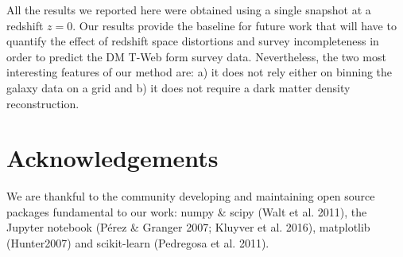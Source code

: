 \documentclass[usenatbib]{mnras}
\begin{document}
All the results we reported here were obtained using a single snapshot at a 
redshift $z=0$.
Our results provide the baseline for future work that will have to quantify 
the effect of redshift space distortions and survey incompleteness in order to
predict  the DM T-Web form survey data.
Nevertheless, the two most interesting features of our method are: a) it does not
rely either on binning the galaxy data on a grid and b) it does not require a dark matter density reconstruction.



\section*{Acknowledgements}

We are thankful to the community developing and maintaining open source packages fundamental to our work: numpy
\&  scipy  (Walt  et  al.  2011),  the  Jupyter  notebook  (P\'erez \& Granger 2007; Kluyver et al. 2016), matplotlib (Hunter2007) and  scikit-learn (Pedregosa et al. 2011).






\bsp	%
\label{lastpage}
\end{document}
